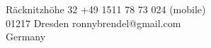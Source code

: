 {\Huge \name}
\vspace{0.5cm}

R\"acknitzh\"ohe 32 \hfill +49 1511 78 73 024 (mobile)\\
01217 Dresden \hfill ronnybrendel@gmail.com\\
Germany \hfill

\vspace{0.6cm}
